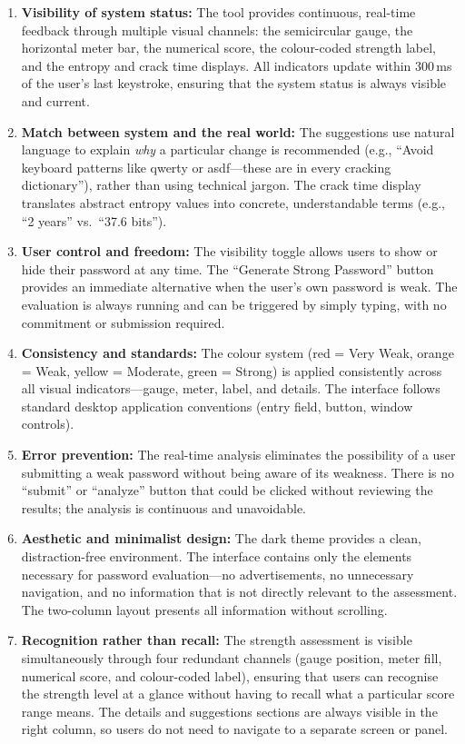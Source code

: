 \begin{enumerate}
    \item \textbf{Visibility of system status:} The tool provides continuous, real-time feedback through multiple visual channels: the semicircular gauge, the horizontal meter bar, the numerical score, the colour-coded strength label, and the entropy and crack time displays. All indicators update within 300\,ms of the user's last keystroke, ensuring that the system status is always visible and current.

    \item \textbf{Match between system and the real world:} The suggestions use natural language to explain \textit{why} a particular change is recommended (e.g., ``Avoid keyboard patterns like qwerty or asdf---these are in every cracking dictionary''), rather than using technical jargon. The crack time display translates abstract entropy values into concrete, understandable terms (e.g., ``2 years'' vs.\ ``37.6 bits'').

    \item \textbf{User control and freedom:} The visibility toggle allows users to show or hide their password at any time. The ``Generate Strong Password'' button provides an immediate alternative when the user's own password is weak. The evaluation is always running and can be triggered by simply typing, with no commitment or submission required.

    \item \textbf{Consistency and standards:} The colour system (red = Very Weak, orange = Weak, yellow = Moderate, green = Strong) is applied consistently across all visual indicators---gauge, meter, label, and details. The interface follows standard desktop application conventions (entry field, button, window controls).

    \item \textbf{Error prevention:} The real-time analysis eliminates the possibility of a user submitting a weak password without being aware of its weakness. There is no ``submit'' or ``analyze'' button that could be clicked without reviewing the results; the analysis is continuous and unavoidable.

    \item \textbf{Aesthetic and minimalist design:} The dark theme provides a clean, distraction-free environment. The interface contains only the elements necessary for password evaluation---no advertisements, no unnecessary navigation, and no information that is not directly relevant to the assessment. The two-column layout presents all information without scrolling.

    \item \textbf{Recognition rather than recall:} The strength assessment is visible simultaneously through four redundant channels (gauge position, meter fill, numerical score, and colour-coded label), ensuring that users can recognise the strength level at a glance without having to recall what a particular score range means. The details and suggestions sections are always visible in the right column, so users do not need to navigate to a separate screen or panel.
\end{enumerate}

